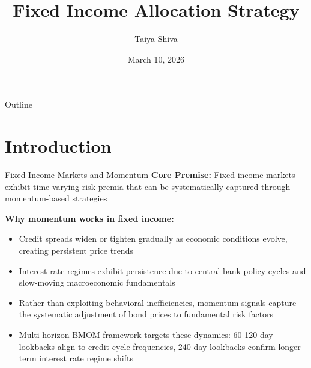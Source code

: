 \documentclass[aspectratio=169,10pt]{beamer}
\title{Fixed Income Allocation Strategy}
\author{Taiya Shiva}
\institute{Hawk Center for Investment Analysis\\Regentfund Project}
\date{March 10, 2026}
\begin{document}
\begin{frame}
\titlepage
\end{frame}

\begin{frame}{Outline}
\tableofcontents
\end{frame}

\section{Introduction}

\begin{frame}{Fixed Income Markets and Momentum}
\textbf{Core Premise:} Fixed income markets exhibit time-varying risk premia that can be systematically captured through momentum-based strategies

\vspace{0.4cm}

\textbf{Why momentum works in fixed income:}
\begin{itemize}
    \item Credit spreads widen or tighten gradually as economic conditions evolve, creating persistent price trends

    \item Interest rate regimes exhibit persistence due to central bank policy cycles and slow-moving macroeconomic fundamentals

    \item Rather than exploiting behavioral inefficiencies, momentum signals capture the systematic adjustment of bond prices to fundamental risk factors

    \item Multi-horizon BMOM framework targets these dynamics: 60-120 day lookbacks align to credit cycle frequencies, 240-day lookbacks confirm longer-term interest rate regime shifts
\end{itemize}
\end{frame}
\end{document}
